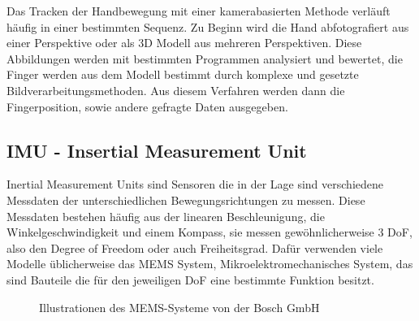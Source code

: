Das Tracken der Handbewegung mit einer kamerabasierten Methode verläuft häufig in einer bestimmten Sequenz. Zu Beginn wird die Hand abfotografiert aus einer Perspektive oder als 3D Modell aus mehreren Perspektiven. Diese Abbildungen werden mit bestimmten Programmen analysiert und bewertet, die Finger werden aus dem Modell bestimmt durch komplexe und gesetzte Bildverarbeitungsmethoden. Aus diesem Verfahren werden dann die Fingerposition, sowie andere gefragte Daten ausgegeben.

\subsection{IMU - Insertial Measurement Unit}
Inertial Measurement Units sind Sensoren die in der Lage sind verschiedene Messdaten der unterschiedlichen Bewegungsrichtungen zu messen. Diese Messdaten bestehen häufig aus der linearen Beschleunigung, die Winkelgeschwindigkeit und einem Kompass, sie messen gewöhnlicherweise 3 DoF, also den Degree of Freedom oder auch Freiheitsgrad.\parencite{Reviews} Dafür verwenden viele Modelle üblicherweise das MEMS System, Mikroelektromechanisches System, das sind Bauteile die für den jeweiligen DoF eine bestimmte Funktion besitzt.
\begin{figure}[H]
    \centering
    \caption{Illustrationen des MEMS-Systeme von der Bosch GmbH}
    \label{fig:BoschFigures}
\end{figure}

